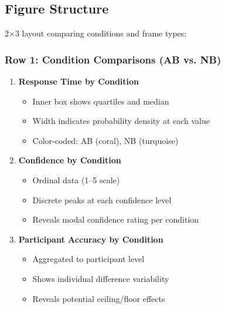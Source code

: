 \documentclass[12pt,a4paper]{article}
\begin{document}
\subsection{Figure Structure}

2×3 layout comparing conditions and frame types:

\subsubsection{Row 1: Condition Comparisons (AB vs. NB)}
\begin{enumerate}
    \item \textbf{Response Time by Condition}
        \begin{itemize}
            \item Inner box shows quartiles and median
            \item Width indicates probability density at each value
            \item Color-coded: AB (coral), NB (turquoise)
        \end{itemize}
    
    \item \textbf{Confidence by Condition}
        \begin{itemize}
            \item Ordinal data (1--5 scale)
            \item Discrete peaks at each confidence level
            \item Reveals modal confidence rating per condition
        \end{itemize}
    
    \item \textbf{Participant Accuracy by Condition}
        \begin{itemize}
            \item Aggregated to participant level
            \item Shows individual difference variability
            \item Reveals potential ceiling/floor effects
        \end{itemize}
\end{enumerate}
\end{document}
